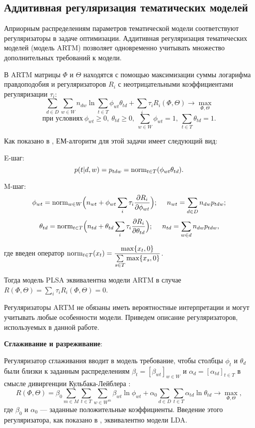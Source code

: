 \subsection{Аддитивная регуляризация тематических моделей}

Априорным распределениям параметров тематической модели соответствуют регуляризаторы в задаче оптимизации. Аддитивная регуляризация тематических моделей (модель ARTM) \cite{ARTM4} позволяет одновременно учитывать множество дополнительных требований к модели. 

В ARTM матрицы $\Phi$ и $\Theta$ находятся с помощью максимизации  суммы логарифма правдоподобия и регуляризаторов $R_i$ с неотрицательными коэффициентами регуляризации
$\tau_i$: 
$$ \sum\limits_{d \in D} \sum\limits_{w \in W} n_{dw} \ln{\sum\limits_{t \in T} \phi_{wt}\theta_{td}} + \sum_{i} \tau_i R_i(\Phi, \Theta) \rightarrow 
\max\limits_{\Phi, \Theta}$$ 
$$ \text{при условиях}  \ \phi_{wt} \geq 0, \ \theta_{td} \geq 0,\ \sum\limits_{w \in W} \phi_{wt} = 1, \ \sum\limits_{t \in T} \theta_{td} = 1.$$

Как показано в \cite{ARTM4}, ЕМ-алгоритм для этой задачи имеет следующий вид:

E-шаг: $$p(t|d, w) = p_{tdw} = \text{norm}_{t\in T}(\phi_{wt}\theta_{td}).$$

M-шаг: $$\phi_{wt} = \text{norm}_{w \in W}\Bigl(n_{wt}+\phi_{wt}\sum\limits_{i}\tau_i\dfrac{\partial  R_i}{\partial \phi_{wt}}\Bigr); \ \  \ \ n_{wt} = \sum\limits_{d \in D} n_{dw} p_{tdw};$$
	$$ \theta_{td} = \text{norm}_{t \in T}\Bigl(n_{td}+\theta_{td}\sum\limits_{i}\tau_i\dfrac{\partial R_i}{\partial \theta_{td}}\Bigr); \ \  \ \ n_{td} = \sum\limits_{w \in d} n_{dw} p_{tdw},$$

где введен оператор $ \text{norm}_{t\in T} (x_t) = \dfrac{\max\{x_t, 0\}}{\sum\limits_{s\in T} \max\{x_s, 0\}}$.

Тогда модель PLSA эквивалентна модели ARTM в случае $R(\Phi, \Theta) = \sum_{i} \tau_i R_i(\Phi, \Theta) = 0$.

Регуляризаторы ARTM не обязаны иметь вероятностные интерпретации и могут учитывать любые особенности модели. Приведем описание регуляризаторов, используемых в данной работе.

\textbf{Сглаживание и разреживание}:

Регуляризатор сглаживания вводит в модель требование, чтобы столбцы $\phi_{t}$ и $\theta_{d}$ были близки к заданным распределениям $\beta_t = [\beta_{wt}]_{w \in W}$ и $\alpha_d = [\alpha_{td}]_{t \in T}$ в смысле дивиргенции Кульбака-Лейблера \cite{ARTM4}:
$$R(\Phi, \Theta) = \beta_0\sum_{m\in M} \sum_{t\in T}\sum_{w \in W^m} \beta_{wt}\ln \phi_{wt} + \alpha_0 \sum_{d\in D} \sum_{t\in T}\alpha_{td} \ln \theta_{td} \rightarrow 
\max\limits_{\Phi, \Theta},$$
где $\beta_0$ и $\alpha_0$ --- заданные положительные коэффициенты. Введение этого регуляризатора, как показано в \cite{ARTM4}, эквивалентно модели LDA.


